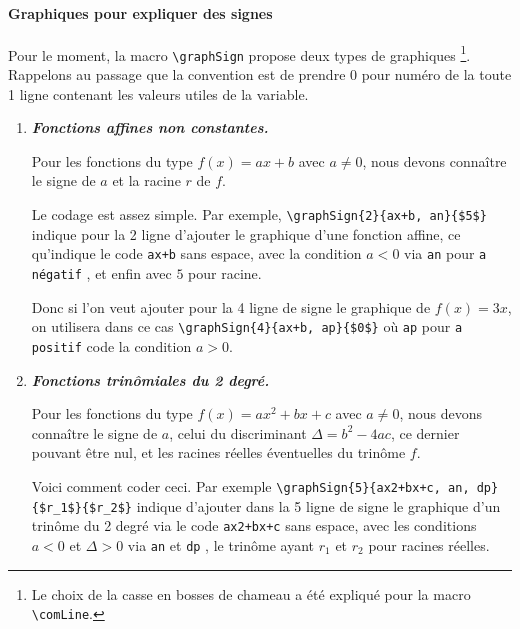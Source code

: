\documentclass[12pt,a4paper]{article}
\newcommand\env[1]{\texttt{#1}}
\newcommand\macro[1]{\env{\textbackslash{}#1}}
\theoremstyle{definition}
\newcommand\prefix[1]{%
	\texttt{#1}%
}
\begin{document}


\paragraph{Graphiques pour expliquer des signes}

Pour le moment, la macro \macro{graphSign} propose deux types de graphiques
\footnote{
    Le choix de la casse en bosses de chameau a été expliqué pour la macro \macro{comLine}.
}.
Rappelons au passage que la convention est de prendre $0$ pour numéro de la toute 1\iere{} ligne contenant les valeurs utiles de la variable.

\begin{enumerate}
    \item \textbf{\itshape Fonctions affines non constantes.}
          
          \smallskip

          Pour les fonctions du type $f(x) = a x + b$ avec $a \neq 0$, nous devons connaître le signe de $a$ et la racine $r$ de $f$.
          
          \smallskip

          Le codage est assez simple.
          Par exemple, \verb#\graphSign{2}{ax+b, an}{$5$}# indique pour la 2\ieme{} ligne d'ajouter le graphique d'une fonction affine, ce qu'indique le code \verb#ax+b# sans espace, avec la condition $a < 0$ via \prefix{an} pour \prefix{a négatif}, et enfin avec $5$ pour racine.
          
          \smallskip

          Donc si l'on veut ajouter pour la 4\ieme{} ligne de signe le graphique de $f(x) = 3x$, on utilisera dans ce cas \verb#\graphSign{4}{ax+b, ap}{$0$}# où \prefix{ap} pour \prefix{a positif} code la condition $a > 0$.




    \medskip
    \item \textbf{\itshape Fonctions trinômiales du 2\ieme{} degré.}
          
          \smallskip

          Pour les fonctions du type $f(x) = a x^2 + b x + c$ avec $a \neq 0$, nous devons connaître le signe de $a$, celui du discriminant $\Delta = b^2 - 4ac$, ce dernier pouvant être nul, et les racines réelles éventuelles du trinôme $f$.

          \smallskip

          Voici comment coder ceci.
          Par exemple \verb#\graphSign{5}{ax2+bx+c, an, dp}{$r_1$}{$r_2$}# indique d'ajouter dans la 5\ieme{} ligne de signe le graphique d'un trinôme du 2\ieme{} degré via le code \verb#ax2+bx+c# sans espace, avec les conditions $a < 0$ et $\Delta > 0$ via \prefix{an} et \prefix{dp}, le trinôme ayant $r_1$ et $r_2$ pour racines réelles.


\end{enumerate}
\end{document}

